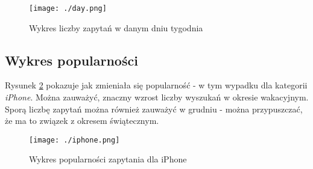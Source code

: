 \documentclass[a4paper,11pt]{article}
\begin{document}
\begin{figure}[H]
	\centering
	\texttt{[image: ./day.png]}
	\caption{\label{fig:day}Wykres liczby zapytań w danym dniu tygodnia}
\end{figure}

\subsection{Wykres popularności}
Rysunek \ref{fig:iphoine} pokazuje jak zmieniała się popularność - w tym wypadku dla kategorii \textit{iPhone}. Można zauważyć, znaczny wzrost liczby wyszukań w okresie wakacyjnym. Sporą liczbę zapytań można również zauważyć w grudniu - można przypuszczać, że ma to związek z okresem świątecznym.
   

\begin{figure}[H]
	\centering
	\texttt{[image: ./iphone.png]}
	\caption{\label{fig:iphoine}Wykres popularności zapytania dla iPhone}
\end{figure}
\end{document}
